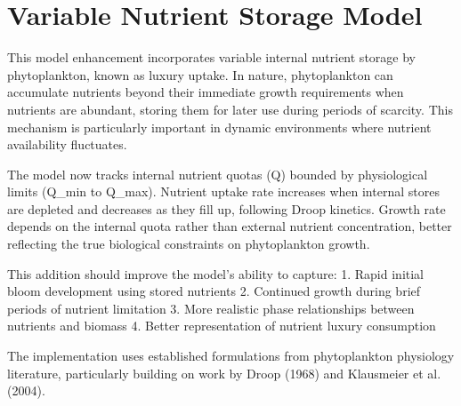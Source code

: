 \section{Variable Nutrient Storage Model}

This model enhancement incorporates variable internal nutrient storage by phytoplankton, known as luxury uptake. In nature, phytoplankton can accumulate nutrients beyond their immediate growth requirements when nutrients are abundant, storing them for later use during periods of scarcity. This mechanism is particularly important in dynamic environments where nutrient availability fluctuates.

The model now tracks internal nutrient quotas (Q) bounded by physiological limits (Q_min to Q_max). Nutrient uptake rate increases when internal stores are depleted and decreases as they fill up, following Droop kinetics. Growth rate depends on the internal quota rather than external nutrient concentration, better reflecting the true biological constraints on phytoplankton growth.

This addition should improve the model's ability to capture:
1. Rapid initial bloom development using stored nutrients
2. Continued growth during brief periods of nutrient limitation
3. More realistic phase relationships between nutrients and biomass
4. Better representation of nutrient luxury consumption

The implementation uses established formulations from phytoplankton physiology literature, particularly building on work by Droop (1968) and Klausmeier et al. (2004).
